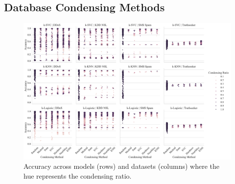 \documentclass[conference]{IEEEtran}
\begin{document}
\subsection{Database Condensing Methods}

\begin{figure}[htb]
    \centering
    \includegraphics[width=\textwidth]{figs/combined/condensing_ratio_vs_accuracy.pdf}
    \caption{Accuracy across models (rows) and datasets (columns) where the hue represents the condensing ratio. }
    \label{fig:condense_acc_ratios}
\end{figure}
\end{document}
